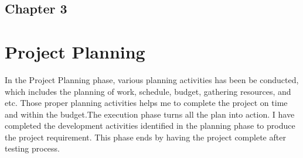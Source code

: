 \begin{center}
    \section*{\fontsize{20}{20}\selectfont Chapter 3}
\end{center}
\vspace{10mm}
\section{Project Planning}

In the Project Planning phase, various planning activities has been be conducted, which includes the planning of work, schedule, budget, gathering resources, and etc. Those proper planning activities helps me to complete the project on time and within the budget.The execution phase turns all the plan into action. I have completed the development activities identified in the planning phase to produce the project requirement. This phase ends by having the project complete after testing process.


